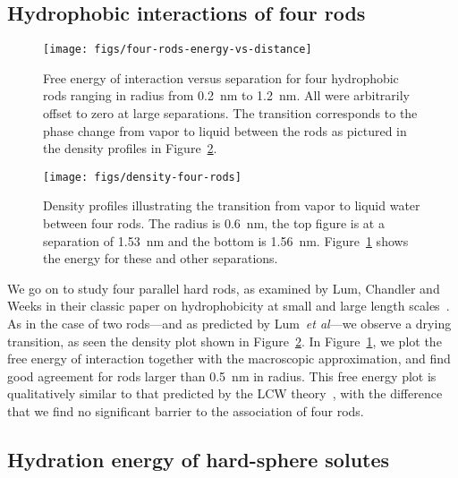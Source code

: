 \documentclass[twocolumn,amsmath,amssymb,prl]{revtex4-1}
\begin{document}
\subsection{Hydrophobic interactions of four rods}

\begin{figure}
\begin{center}
\texttt{[image: figs/four-rods-energy-vs-distance]}
\end{center}
\caption{ Free energy of interaction
versus separation for four hydrophobic rods ranging in radius from
0.2~nm to 1.2~nm.
All were arbitrarily offset to zero at large separations. The
transition corresponds to the phase change from
vapor to liquid between the rods as pictured in the density profiles in 
Figure~\ref{fig:density-four-rods}. }
\label{fig:four-rods-energy-vs-distance}
\end{figure}

\begin{figure}
\begin{center}
\texttt{[image: figs/density-four-rods]}
\end{center}
\caption{ Density profiles illustrating the transition from vapor 
to liquid water between four rods. The radius is 0.6~nm, the top figure is
at a separation of 1.53~nm and the
bottom is 1.56~nm. Figure~\ref{fig:four-rods-energy-vs-distance} shows
the energy for these and other separations.}
\label{fig:density-four-rods}
\end{figure}

We go on to study four parallel hard rods, as examined by Lum,
Chandler and Weeks in their classic paper on hydrophobicity at small
and large length scales~\cite{lum1999hydrophobicity}.  As in the case
of two rods---and as predicted by Lum~\emph{et al}---we observe a
drying transition, as seen the density plot shown in
Figure~\ref{fig:density-four-rods}.  In
Figure~\ref{fig:four-rods-energy-vs-distance}, we plot the free energy
of interaction together with the macroscopic approximation, and find
good agreement for rods larger than 0.5~nm in radius.  This free
energy plot is qualitatively similar to that predicted by the LCW
theory~\cite{lum1999hydrophobicity}, with the difference that we find
no significant barrier to the association of four rods.

\subsection{Hydration energy of hard-sphere solutes}
\end{document}
